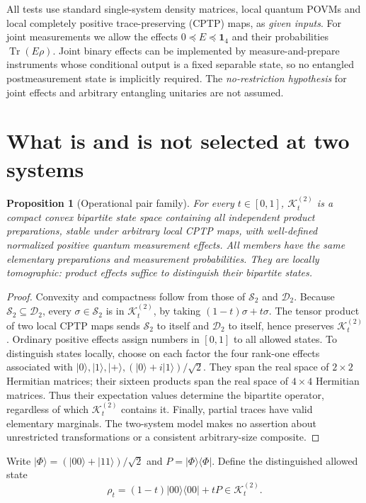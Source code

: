 \documentclass[11pt,letterpaper]{article}
\newtheorem{proposition}[theorem]{Proposition}
\newcommand{\D}{\mathcal{D}}
\newcommand{\Ssep}{\mathcal{S}}
\newcommand{\K}{\mathcal{K}}
\newcommand{\tr}{\operatorname{Tr}}
\newcommand{\id}{\mathbf{1}}
\begin{document}
All tests use standard single-system density matrices, local quantum POVMs and
local completely positive trace-preserving (CPTP) maps, as \emph{given inputs}.
For joint measurements we allow the effects $0\preceq E\preceq\id_4$ and their
probabilities $\tr(E\rho)$. Joint binary effects can be implemented by
measure-and-prepare instruments whose conditional output is a fixed separable
state, so no entangled postmeasurement state is implicitly required. The
\emph{no-restriction hypothesis} for joint effects and arbitrary entangling
unitaries are not assumed.

\section{What is and is not selected at two systems}
\begin{proposition}[Operational pair family]\label{prop:pair}
For every $t\in[0,1]$, $\K_t^{(2)}$ is a compact convex bipartite state space
containing all independent product preparations, stable under arbitrary local
CPTP maps, with well-defined normalized positive quantum measurement effects.
All members have the same elementary preparations and measurement probabilities.
They are locally tomographic: product effects suffice to distinguish their
bipartite states.
\end{proposition}
\begin{proof}
Convexity and compactness follow from those of $\Ssep_2$ and $\D_2$.
Because $\Ssep_2\subseteq\D_2$, every $\sigma\in\Ssep_2$ is in
$\K_t^{(2)}$, by taking $(1-t)\sigma+t\sigma$. The tensor product of two
local CPTP maps sends $\Ssep_2$ to itself and $\D_2$ to itself, hence preserves
$\K_t^{(2)}$. Ordinary positive effects assign numbers in $[0,1]$ to all
allowed states. To distinguish states locally, choose on each factor the four
rank-one effects associated with $|0\rangle,|1\rangle,|+\rangle,
(|0\rangle+i|1\rangle)/\sqrt{2}$. They span the real space of $2\times2$
Hermitian matrices; their sixteen products span the real space of $4\times4$
Hermitian matrices. Thus their expectation values determine the bipartite
operator, regardless of which $\K_t^{(2)}$ contains it. Finally, partial traces
have valid elementary marginals. The two-system model makes no assertion about
unrestricted transformations or a consistent arbitrary-size composite.
\end{proof}

Write $|\Phi\rangle=(|00\rangle+|11\rangle)/\sqrt{2}$ and
$P=|\Phi\rangle\langle\Phi|$. Define the distinguished allowed state
\begin{equation}\label{eq:rho}
\rho_t=(1-t)|00\rangle\langle00|+tP \in\K_t^{(2)}.
\end{equation}
\end{document}
